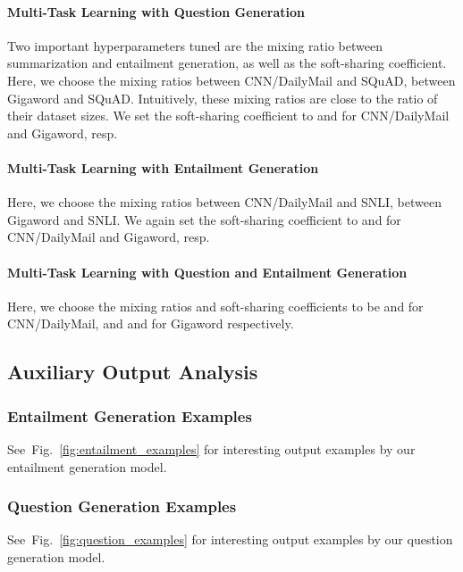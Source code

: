 \documentclass[11pt,a4paper]{article}
\def\figref#1{Fig.~\ref{#1}}
\begin{document}
\paragraph{Multi-Task Learning with Question Generation}
Two important hyperparameters tuned are the mixing ratio between summarization and entailment generation, as well as the soft-sharing coefficient.
Here, we choose the mixing ratios  between CNN/DailyMail and SQuAD,  between Gigaword and SQuAD. Intuitively, these mixing ratios are close to the ratio of their dataset sizes. 
We set the soft-sharing coefficient  to  and  for CNN/DailyMail and Gigaword, resp.
 
\paragraph{Multi-Task Learning with Entailment Generation}
Here, we choose the mixing ratios  between CNN/DailyMail and SNLI,  between Gigaword and SNLI. We again set the soft-sharing coefficient  to  and  for CNN/DailyMail and Gigaword, resp. 
 

\paragraph{Multi-Task Learning with Question and  Entailment Generation}
 Here, we choose the mixing ratios and soft-sharing coefficients to be  and  for CNN/DailyMail, and  and  for Gigaword respectively. 

\subsection{Auxiliary Output Analysis}
\subsubsection{Entailment Generation Examples}
See~\figref{fig:entailment_examples} for interesting output examples by our entailment generation model.




\subsubsection{Question Generation Examples}
See~\figref{fig:question_examples} for interesting output examples by our question generation model.

 
\end{document}
